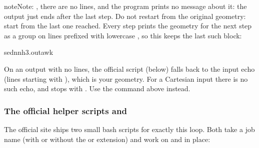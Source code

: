 \documentclass[letterpaper,10pt,english,openany,oneside]{sphinxmanual}
\begin{document}
\begin{sphinxadmonition}{note}{Note:}
\sphinxAtStartPar
{}, there are no  lines, and the program prints no message about it:
the output just ends after the last step. Do not restart from the original geometry: start from the last one
reached. Every step prints the geometry for the next step as a  group on lines prefixed with lowercase
, so this keeps the last such block:

\begin{sphinxVerbatim}[commandchars=\\\{\}]
sed\PYGZhy{}nnh3.outawk
\end{sphinxVerbatim}

\sphinxAtStartPar
On an output with no  lines, the official  script (below) falls back to the input echo (lines starting
with ), which is your  geometry. For a Cartesian input there is no such echo, and  stops
with . Use the command above instead.


\end{sphinxadmonition}


\subsubsection{The official helper scripts  and }
\label{\detokenize{start/getting-started:the-official-helper-scripts-ge-and-gm}}
\sphinxAtStartPar
The official site ships two small bash scripts for exactly this loop. Both take a job name (with or without the 
or  extension) and work on  and  in place:
\end{document}
